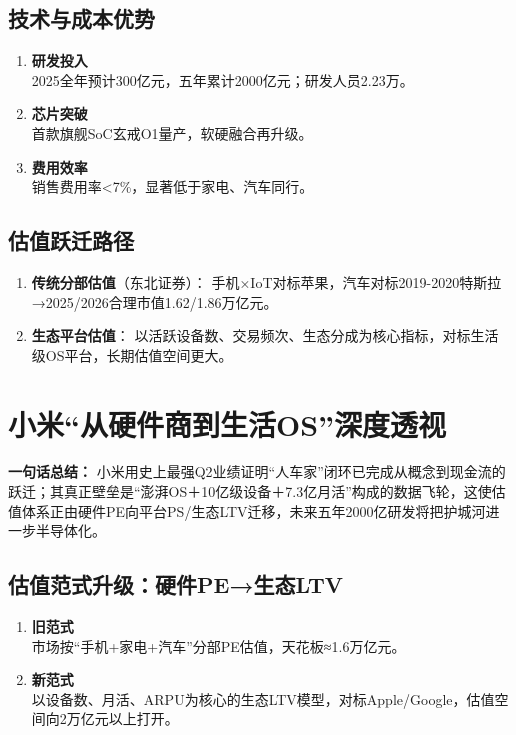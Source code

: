 \subsection{技术与成本优势}
\begin{enumerate}[leftmargin=*, nosep]
    \item \textbf{研发投入}\\
     2025全年预计300亿元，五年累计2000亿元；研发人员2.23万。  
    \item \textbf{芯片突破}\\
     首款旗舰SoC玄戒O1量产，软硬融合再升级。  
    \item \textbf{费用效率} \\
    销售费用率<7\%，显著低于家电、汽车同行。  
\end{enumerate}

\subsection{估值跃迁路径}
\begin{enumerate}[leftmargin=*, nosep]
    \item \textbf{传统分部估值}（东北证券）：  
    手机×IoT对标苹果，汽车对标2019-2020特斯拉→2025/2026合理市值1.62/1.86万亿元。  
    \item \textbf{生态平台估值}：  
    以活跃设备数、交易频次、生态分成为核心指标，对标生活级OS平台，长期估值空间更大。  
\end{enumerate}


\section{小米“从硬件商到生活OS”深度透视}
\textbf{一句话总结：}  
小米用史上最强Q2业绩证明{\color{red}“人车家”闭环}已完成从概念到现金流的跃迁；其真正壁垒是“澎湃OS＋10亿级设备＋7.3亿月活”构成的数据飞轮，这使估值体系正由硬件PE向平台PS/生态LTV迁移，未来五年2000亿研发将把护城河进一步半导体化。

\subsection{估值范式升级：硬件PE→生态LTV}
\begin{enumerate}[leftmargin=*, nosep]
    \item \textbf{旧范式}  \\
    市场按“手机+家电+汽车”分部PE估值，天花板≈1.6万亿元。
    \item \textbf{新范式}  \\
    以设备数、月活、ARPU为核心的生态LTV模型，对标Apple/Google，估值空间向2万亿元以上打开。
\end{enumerate}

